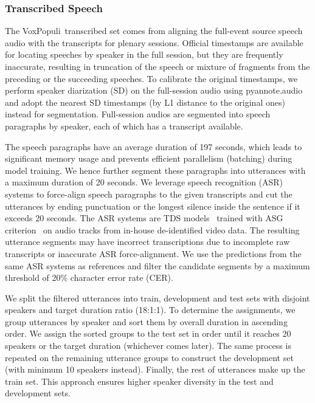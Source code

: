 \documentclass[11pt,a4paper]{article}
\newcommand{\vp}{VoxPopuli}
\begin{document}
\subsubsection{Transcribed Speech}
\label{sec:transcribed_speech}
The \vp~transcribed set comes from aligning the full-event source speech audio with the transcripts for plenary sessions. Official timestamps are available for locating speeches by speaker in the full session, but they are frequently inaccurate, resulting in truncation of the speech or mixture of fragments from the preceding or the succeeding speeches. To calibrate the original timestamps, we perform speaker diarization (SD) on the full-session audio using pyannote.audio~\citep{Bredin2020} and adopt the nearest SD timestamps (by L1 distance to the original ones) instead for segmentation. Full-session audios are segmented into speech paragraphs by speaker, each of which has a transcript available.

The speech paragraphs have an average duration of 197 seconds, which leads to significant memory usage and prevents efficient parallelism (batching) during model training. We hence further segment these paragraphs into utterances with a maximum duration of 20 seconds. We leverage speech recognition (ASR) systems to force-align speech paragraphs to the given transcripts and cut the utterances by ending punctuation or the longest silence inside the sentence if it exceeds 20 seconds. The ASR systems are TDS models~\citep{TDS2019} trained with ASG criterion~\citep{collobert2016wav2letter} on audio tracks from in-house de-identified video data. The resulting utterance segments may have incorrect transcriptions due to incomplete raw transcripts or inaccurate ASR force-alignment. We use the predictions from the same ASR systems as references and filter the candidate segments by a maximum threshold of 20\% character error rate (CER).

We split the filtered utterances into train, development and test sets with disjoint speakers and target duration ratio (18:1:1). To determine the assignments, we group utterances by speaker and sort them by overall duration in ascending order. We assign the sorted groups to the test set in order until it reaches 20 speakers or the target duration (whichever comes later). The same process is repeated on the remaining utterance groups to construct the development set (with minimum 10 speakers instead). Finally, the rest of utterances make up the train set. This approach ensures higher speaker diversity in the test and development sets.
\end{document}
